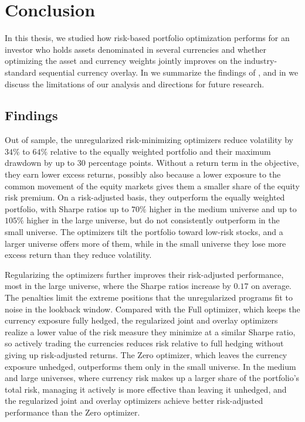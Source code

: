 \chapter{Conclusion}\label{chap:conclusion}

In this thesis, we studied how risk-based portfolio optimization performs for an investor who holds assets denominated
in several currencies and whether optimizing the asset and currency weights jointly improves on the industry-standard
sequential currency overlay. In  we summarize the findings of
, and in  we discuss the
limitations of our analysis and directions for future research.

\section{Findings}\label{sec:conclusion-findings}

Out of sample, the unregularized risk-minimizing optimizers reduce volatility by $34\%$ to $64\%$ relative to the equally weighted
portfolio and their maximum drawdown by up to $30$ percentage points. Without a return
term in the objective, they earn lower excess returns, possibly also because a lower exposure to the common movement of
the equity markets gives them a smaller share of the equity risk premium. On a risk-adjusted basis, they outperform the equally
weighted portfolio, with Sharpe ratios up to $70\%$ higher in the medium universe and up to $105\%$ higher in the large universe, 
but do not consistently outperform in the small universe. The optimizers tilt the portfolio toward low-risk stocks, and a larger
universe offers more of them, while in the small universe they lose more excess return than they reduce volatility.

Regularizing the optimizers further improves their risk-adjusted performance, most in the large universe, where the Sharpe ratios 
increase by $0.17$ on average. 
The penalties limit the extreme positions that the unregularized programs fit to
noise in the lookback window. Compared with the Full optimizer, which keeps the currency exposure fully hedged, the
regularized joint and overlay optimizers realize a lower value of the risk measure they minimize at a similar Sharpe
ratio, so actively trading the currencies reduces risk relative to full hedging without giving up risk-adjusted returns.
The Zero optimizer, which leaves the currency exposure unhedged,
outperforms them only in the small universe. In the medium and large universes, where currency risk makes up a larger
share of the portfolio's total risk, managing it actively is more effective than leaving it unhedged, and the 
regularized joint and overlay optimizers achieve better risk-adjusted performance than the Zero optimizer.


